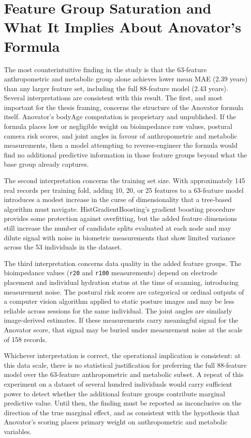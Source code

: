 \documentclass[11pt,a4paper]{report}
\begin{document}
\section{Feature Group Saturation and What It Implies About Anovator's Formula}

The most counterintuitive finding in the study is that the 63-feature anthropometric and metabolic
group alone achieves lower mean MAE (2.39 years) than any larger feature set, including the full
88-feature model (2.43 years). Several interpretations are consistent with this result. The first, and most important for the
thesis framing, concerns the structure of the Anovator formula itself. Anovator's bodyAge
computation is proprietary and unpublished. If the formula places low or negligible weight on
bioimpedance raw values, postural camera risk scores, and joint angles in favour of anthropometric
and metabolic measurements, then a model attempting to reverse-engineer the formula would find no
additional predictive information in those feature groups beyond what the base group already
captures.

The second interpretation concerns the training set size. With approximately 145 real records per
training fold, adding 10, 20, or 25 features to a 63-feature model introduces a modest increase
in the curse of dimensionality that a tree-based algorithm must navigate.
HistGradientBoosting's gradient boosting procedure provides some protection against overfitting,
but the added feature dimensions still increase the number of candidate splits evaluated at each
node and may dilute signal with noise in biometric measurements that show limited variance across
the 53 individuals in the dataset.

The third interpretation concerns data quality in the added feature groups. The bioimpedance
values (\texttt{r20} and \texttt{r100} measurements) depend on electrode placement and individual
hydration status at the time of scanning, introducing measurement noise. The postural risk scores
are categorical or ordinal outputs of a computer vision algorithm applied to static posture images
and may be less reliable across sessions for the same individual. The joint angles are similarly
image-derived estimates. If these measurements carry meaningful signal for the Anovator score,
that signal may be buried under measurement noise at the scale of 158 records.

Whichever interpretation is correct, the operational implication is consistent: at this data
scale, there is no statistical justification for preferring the full 88-feature model over the
63-feature anthropometric and metabolic subset. A repeat of this experiment on a dataset of
several hundred individuals would carry sufficient power to detect whether the additional feature
groups contribute marginal predictive value. Until then, the finding must be reported as
inconclusive on the direction of the true marginal effect, and as consistent with the hypothesis
that Anovator's scoring places primary weight on anthropometric and metabolic variables.
\end{document}
